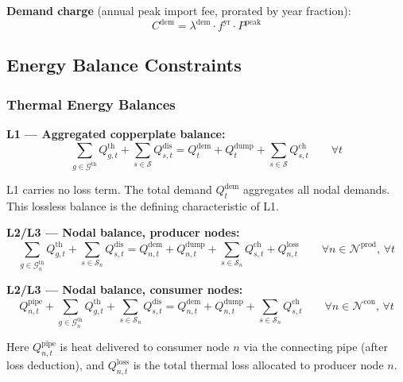 \documentclass[review,3p]{elsarticle}
\begin{document}
\textbf{Demand charge} (annual peak import fee, prorated by year
fraction):
\begin{equation}
C^{\mathrm{dem}} = \lambda^{\mathrm{dem}} \cdot f^{\mathrm{yr}}
\cdot P^{\mathrm{peak}}
\label{eq:cost_demand}
\end{equation}

\subsection{Energy Balance Constraints}
\label{sec:model_balance}

\subsubsection{Thermal Energy Balances}

\textbf{L1 --- Aggregated copperplate balance:}
\begin{equation}
\sum_{g \in \mathcal{G}^{\mathrm{th}}} Q_{g,t}^{\mathrm{th}}
+ \sum_{s \in \mathcal{S}} Q_{s,t}^{\mathrm{dis}}
= Q_t^{\mathrm{dem}} + Q_t^{\mathrm{dump}}
+ \sum_{s \in \mathcal{S}} Q_{s,t}^{\mathrm{ch}}
\qquad \forall t
\label{eq:balance_L1}
\end{equation}

L1 carries no loss term. The total demand $Q_t^{\mathrm{dem}}$
aggregates all nodal demands. This lossless balance is the defining
characteristic of L1.

\textbf{L2/L3 --- Nodal balance, producer nodes:}
\begin{equation}
\sum_{g \in \mathcal{G}_n^{\mathrm{th}}} Q_{g,t}^{\mathrm{th}}
+ \sum_{s \in \mathcal{S}_n} Q_{s,t}^{\mathrm{dis}}
= Q_{n,t}^{\mathrm{dem}} + Q_{n,t}^{\mathrm{dump}}
+ \sum_{s \in \mathcal{S}_n} Q_{s,t}^{\mathrm{ch}}
+ Q_{n,t}^{\mathrm{loss}}
\qquad \forall n \in \mathcal{N}^{\mathrm{prod}},\, \forall t
\label{eq:balance_prod}
\end{equation}

\textbf{L2/L3 --- Nodal balance, consumer nodes:}
\begin{equation}
Q_{n,t}^{\mathrm{pipe}}
+ \sum_{g \in \mathcal{G}_n^{\mathrm{th}}} Q_{g,t}^{\mathrm{th}}
+ \sum_{s \in \mathcal{S}_n} Q_{s,t}^{\mathrm{dis}}
= Q_{n,t}^{\mathrm{dem}} + Q_{n,t}^{\mathrm{dump}}
+ \sum_{s \in \mathcal{S}_n} Q_{s,t}^{\mathrm{ch}}
\qquad \forall n \in \mathcal{N}^{\mathrm{con}},\, \forall t
\label{eq:balance_consumer}
\end{equation}

Here $Q_{n,t}^{\mathrm{pipe}}$ is heat delivered to consumer node $n$
via the connecting pipe (after loss deduction), and $Q_{n,t}^{\mathrm{loss}}$
is the total thermal loss allocated to producer node $n$.
\end{document}
